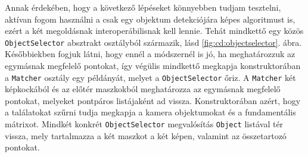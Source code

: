 Annak érdekében, hogy a következő lépéseket könnyebben tudjam tesztelni, aktívan fogom használni a csak egy objektum detekciójára képes algoritmust is, ezért a két megoldásnak interoperábilisnak kell lennie. Tehát mindkettő egy közös \texttt{ObjectSelector} absztrakt osztályból származik, lásd \ref{fig:cd:objectselector}. ábra. Későbbiekben fogjuk látni, hogy ennél a módszernél is jó, ha meghatározzuk az egymásnak megfelelő pontokat, így végülis mindkettő megkapja konstruktorában a \texttt{Matcher} osztály egy példányát, melyet a \texttt{ObjectSelector} őriz. A \texttt{Matcher} két képkockából és az előtér maszkokból meghatározza az egymásnak megfelelő pontokat, melyeket pontpáros listájaként ad vissza. Konstruktorában azért, hogy a találatokat szűrni tudja megkapja a kamera objektumokat és a fundamentális mátrixot. Mindkét konkrét \texttt{ObjectSelector} megvalósítás \texttt{Object} listával tér vissza, mely tartalmazza a két maszkot a két képen, valamint az összetartozó pontokat.


